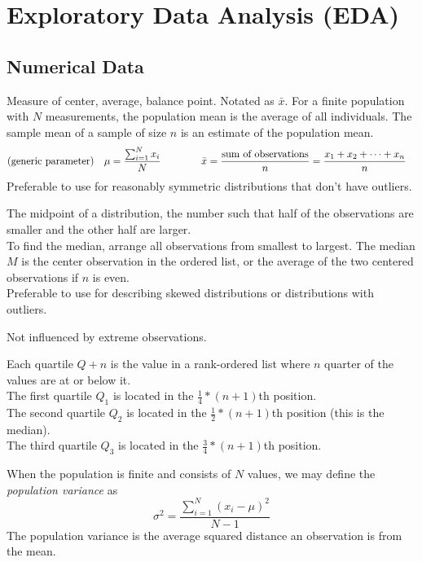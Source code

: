 \documentclass[]{article}
\newenvironment{definitions}{
	\begin{description}[font=\sffamily\bfseries, leftmargin=1cm, style=nextline]
	}{
	\end{description}
}
\begin{document}
	\section{Exploratory Data Analysis (EDA)}
	\subsection{Numerical Data}
		\begin{definitions}
			\item[Mean]
			Measure of center, average, balance point. Notated as $\bar{x}$. For a finite population with $N$ measurements, the population mean is the average of all individuals. The sample mean of a sample of size $n$ is an estimate of the population mean.
			\begin{align*}
				\text{(generic parameter)\quad} \mu = \frac{\sum_{i=1}^{N}x_i}{N}
				\qquad & \qquad \bar{x} = \frac{\text{sum of observations}}{n} = \frac{x_1+x_2+\dots+x_n}{n}
			\end{align*}
			Preferable to use for reasonably symmetric distributions that don't have outliers.
			\item[Median]
			The midpoint of a distribution, the number such that half of the observations are smaller and the other half are larger.\\
			To find the median, arrange all observations from smallest to largest. The median $M$ is the center observation in the ordered list, or the average of the two centered observations if $n$ is even.\\
			Preferable to use for describing skewed distributions or distributions with outliers.
			\item[Robust/Resistant]
			Not influenced by extreme observations.
			\item[Quartiles]
			Each quartile $Q+n$ is the value in a rank-ordered list where $n$ quarter of the values are at or below it.\\
			The first quartile $Q_1$ is located in the $\frac{1}{4}\ast (n+1)$th position.\\
			The second quartile $Q_2$ is located in the $\frac{1}{2}\ast (n+1)$th position (this is the median).\\
			The third quartile $Q_3$ is located in the $\frac{3}{4}\ast (n+1)$th position.
			\item[Variance]
			When the population is finite and consists of $N$ values, we may define the \textit{population variance} as
			\[\sigma^2 = \frac{\sum_{i=1}^{N}(x_i - \mu)^2}{N-1}\]
			The population variance is the average squared distance an observation is from the mean.

\end{definitions}
\end{document}
